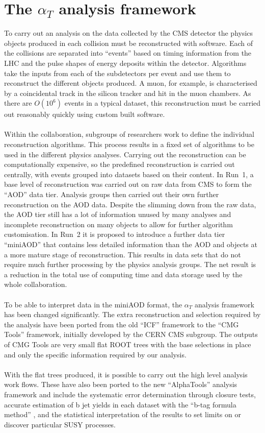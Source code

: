 
\section{The $\alpha_T$ analysis framework}
\label{sec:analysisFw}

To carry out an analysis on the data collected by the CMS detector the physics objects produced in each collision must be reconstructed with software. Each of the collisions are separated into ``events'' based on timing information from the LHC and the pulse shapes of energy deposits within the detector. Algorithms take the inputs from each of the subdetectors per event and use them to reconstruct the different objects produced. A muon, for example, is characterised by a coincidental track in the silicon tracker and hit in the muon chambers. As there are $O(10^6)$ events in a typical dataset, this reconstruction must be carried out reasonably quickly using custom built software.
\\\\
Within the collaboration, subgroups of researchers work to define the individual reconstruction algorithms. This process results in a fixed set of algorithms to be used in the different physics analyses. Carrying out the reconstruction can be computationally expensive, so the predefined reconstruction is carried out centrally, with events grouped into datasets based on their content. In Run~1, a base level of reconstruction was carried out on raw data from CMS to form the ``AOD'' data tier. Analysis groups then carried out their own further reconstruction on the AOD data. Despite the slimming down from the raw data, the AOD tier still has a lot of information unused by many analyses and incomplete reconstruction on many objects to allow for further algorithm customisation. In Run~2 it is proposed to introduce a further data tier ``miniAOD'' that contains less detailed information than the AOD and objects at a more mature stage of reconstruction. This results in data sets that do not require much further processing by the physics analysis groups. The net result is a reduction in the total use of computing time and data storage used by the whole collaboration.
\\\\
To be able to interpret data in the miniAOD format, the $\alpha_T$ analysis framework has been changed significantly. The extra reconstruction and selection required by the analysis have been ported from the old ``ICF'' framework to the ``CMG Tools'' framework, initially developed by the CERN CMS subgroup. The outputs of CMG Tools are very small flat ROOT trees with the base selections in place and only the specific information required by our analysis.
\\\\
With the flat trees produced, it is possible to carry out the high level analysis work flows. These have also been ported to the new ``AlphaTools'' analysis framework and include the systematic error determination through closure tests, accurate estimation of b jet yields in each dataset with the ``b-tag formula method'' \cite{btagFormula}, and the statistical interpretation of the results to set limits on or discover particular SUSY processes.